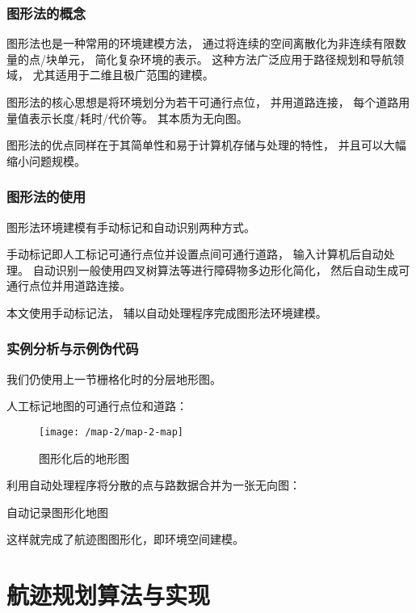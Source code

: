 \documentclass[12pt,a4paper,oneside,UTF8]{ctexart}
\begin{document}
\subsubsection{图形法的概念}
图形法也是一种常用的环境建模方法，
通过将连续的空间离散化为非连续有限数量的点/块单元，
简化复杂环境的表示。
这种方法广泛应用于路径规划和导航领域，
尤其适用于二维且极广范围的建模。

图形法的核心思想是将环境划分为若干可通行点位，
并用道路连接，
每个道路用量值表示长度/耗时/代价等。
其本质为无向图。

图形法的优点同样在于其简单性和易于计算机存储与处理的特性，
并且可以大幅缩小问题规模。
\subsubsection{图形法的使用}
图形法环境建模有手动标记和自动识别两种方式。

手动标记即人工标记可通行点位并设置点间可通行道路，
输入计算机后自动处理。
自动识别一般使用四叉树算法等进行障碍物多边形化简化，
然后自动生成可通行点位并用道路连接。

本文使用手动标记法，
辅以自动处理程序完成图形法环境建模。
\subsubsection{实例分析与示例伪代码}
我们仍使用上一节栅格化时的分层地形图。

人工标记地图的可通行点位和道路：
\begin{figure}[H]
  \centering
  \texttt{[image: /map-2/map-2-map]}
  \caption{图形化后的地形图}
  \label{fig:map-2-map}
\end{figure}

利用自动处理程序将分散的点与路数据合并为一张无向图：

\begin{algorithm}[H]
  \caption{自动记录图形化地图}\label{algorithm-map-noted}

\end{algorithm}

这样就完成了航迹图图形化，即环境空间建模。
\newpage\section{航迹规划算法与实现}
\end{document}
